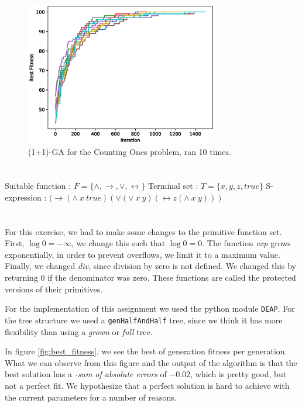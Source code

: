\documentclass[11pt]{article}
\begin{document}
\begin{figure}[H]
\centering
\includegraphics[width=0.75\textwidth]{images/ga.eps}
\caption{(1+1)-GA for the Counting Ones problem, ran 10 times.}
\label{fig:ga}
\end{figure}

\section{}
Suitable function : $F = \{\wedge,\rightarrow, \vee,\leftrightarrow \}$
\newline Terminal set : $T = \{x,y,z,true\}$
\newline S-expression : $ (\rightarrow (\land\ x\ true)(\lor (\lor\ x\ y)(\leftrightarrow z(\land\ x\ y))) $

\section{}
For this exercise, we had to make some changes to the primitive function set. 
First, $\log{0} = -\infty$, we change this such that $\log{0} = 0$. The function \textit{exp} grows exponentially, in order to prevent overflows, we limit it to a maximum value. Finally, we changed \textit{div}, since division by zero is not defined. We changed this by returning 0 if the denominator was zero. These functions are called the protected versions of their primitives.

For the implementation of this assignment we used the python module \texttt{DEAP}. For the tree structure we used a \texttt{genHalfAndHalf} tree, since we think it has more flexibility than using a \textit{grown} or \textit{full} tree. 

In figure \ref{fig:best_fitness}, we see the best of generation fitness per generation. What we can observe from this figure and the output of the algorithm is that the best solution has a \textit{-sum of absolute errors} of $-0.02$, which is pretty good, but not a perfect fit. We hypothesize that a perfect solution is hard to achieve with the current parameters for a number of reasons. 
\end{document}
